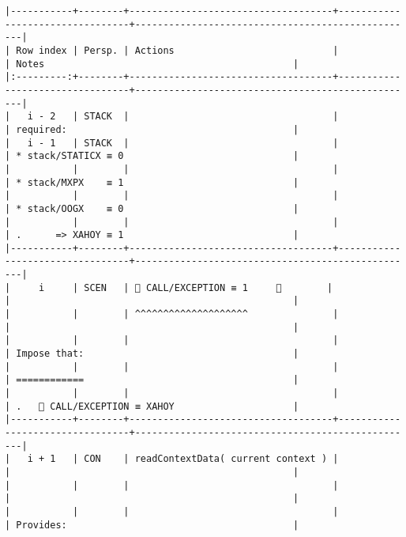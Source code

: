 \documentclass[varwidth=\maxdimen,margin=0.5cm,multi={verbatim}]{standalone}
\begin{document}
\begin{verbatim}
|-----------+--------+------------------------------------+---------------------------------+--------------------------------------------------|
| Row index | Persp. | Actions                            |                                 | Notes                                            |
|:---------:+--------+------------------------------------+---------------------------------+--------------------------------------------------|
|   i - 2   | STACK  |                                    |                                 | required:                                        |
|   i - 1   | STACK  |                                    |                                 | * stack/STATICX ≡ 0                              |
|           |        |                                    |                                 | * stack/MXPX    ≡ 1                              |
|           |        |                                    |                                 | * stack/OOGX    ≡ 0                              |
|           |        |                                    |                                 | .      => XAHOY ≡ 1                              |
|-----------+--------+------------------------------------+---------------------------------+--------------------------------------------------|
|     i     | SCEN   |  CALL/EXCEPTION ≡ 1     👋        |                                 |                                                  |
|           |        | ^^^^^^^^^^^^^^^^^^^^               |                                 |                                                  |
|           |        |                                    |                                 | Impose that:                                     |
|           |        |                                    |                                 | ============                                     |
|           |        |                                    |                                 | .    CALL/EXCEPTION ≡ XAHOY                     |
|-----------+--------+------------------------------------+---------------------------------+--------------------------------------------------|
|   i + 1   | CON    | readContextData( current context ) |                                 |                                                  |
|           |        |                                    |                                 |                                                  |
|           |        |                                    |                                 | Provides:                                        |

\end{verbatim}
\end{document}
